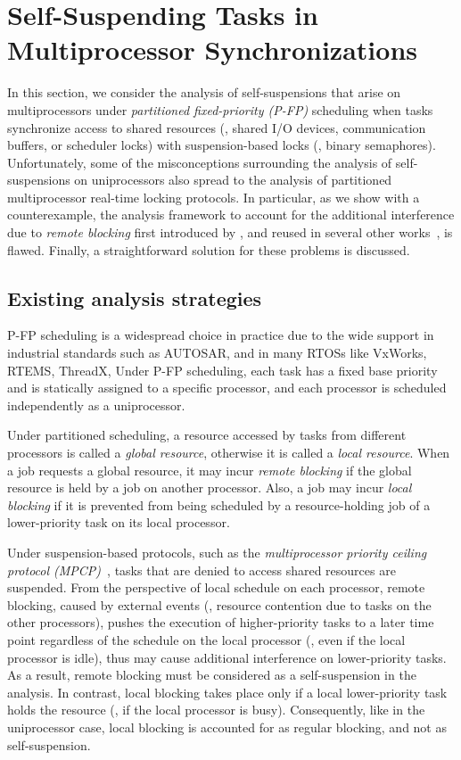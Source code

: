 \section{Self-Suspending Tasks in Multiprocessor Synchronizations}
\label{sec:syn}

In this section, we consider the analysis of self-suspensions that arise on multiprocessors under \emph{partitioned fixed-priority (P-FP)} scheduling when tasks synchronize access to shared resources (\eg, shared I/O devices, communication buffers, or scheduler locks) with suspension-based locks (\eg, binary semaphores). Unfortunately, some of the misconceptions surrounding the analysis of self-suspensions on uniprocessors also spread to the analysis of partitioned multiprocessor real-time locking protocols. In particular, as we show with a counterexample, the analysis framework to account for the additional interference due to \emph{remote blocking} first introduced by \cite{lakshmanan-2009}, and reused in several other works~\cite{zeng-2011,bbb-2013,yang-2013,kim-2014,han-2014,carminati-2014,yang-2014},  is flawed. Finally, a straightforward solution for these problems is discussed. 

\subsection{Existing analysis strategies}
\label{sec:papers}

P-FP scheduling is a widespread choice in practice due to the wide support in industrial standards such as AUTOSAR, and in many RTOSs like VxWorks, RTEMS, ThreadX, \etc Under P-FP scheduling, each task has a fixed base priority and is statically assigned to a specific processor, and each processor is scheduled independently as a uniprocessor. 

Under partitioned scheduling, a resource accessed by tasks from different processors is called a \emph{global resource}, otherwise it is called a \emph{local resource}. When a job requests a global resource, it may incur \emph{remote blocking} if the global resource is held by a job on another processor. Also, a job may incur \emph{local blocking} if it is prevented from being scheduled by a resource-holding job of a lower-priority task on its local processor. 

Under suspension-based protocols, such as the \emph{multiprocessor priority ceiling protocol (MPCP)}~\cite{rajkumar-1990}, tasks that are denied to access shared resources are suspended. From the perspective of local schedule on each processor, remote blocking, caused by external events (\ie, resource contention due to tasks on the other processors), pushes the execution of higher-priority tasks to a later time point regardless of the schedule on the local processor (\ie, even if the local processor is idle), thus may cause additional interference on lower-priority tasks. As a result, remote blocking must be considered as a self-suspension in the analysis. In contrast, local blocking takes place only if a local lower-priority task holds the resource (\ie, if the local processor is busy). Consequently, like in the uniprocessor case, local blocking is accounted for as regular blocking, and not as self-suspension.

